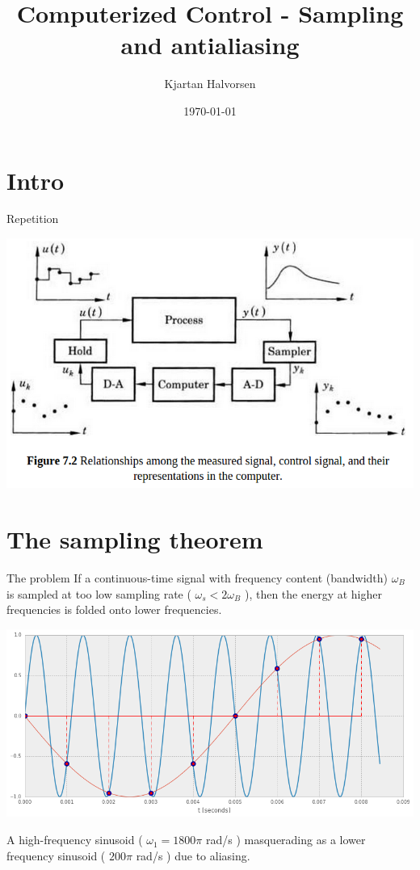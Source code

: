 \documentclass[presentation,aspectratio=169]{beamer}
\author{Kjartan Halvorsen}
\date{\today}
\title{Computerized Control - Sampling and antialiasing}
\begin{document}
\maketitle


\section{Intro}
\label{sec-1}

\begin{frame}[label=sec-1-1]{Repetition}
\begin{center}
\includegraphics[width=0.7\linewidth]{../../figures/fig7-2.png}
\end{center}
\end{frame}



\section{The sampling theorem}
\label{sec-2}
\begin{frame}[label=sec-2-1]{The problem}
If a continuous-time signal with frequency content (bandwidth) $\omega_B$ is sampled at too low sampling rate ( \(\omega_s < 2\omega_B\) ), then the energy at higher frequencies is folded onto lower frequencies. 

\begin{center}
\includegraphics[width=0.7\linewidth]{../../figures/aliasing-example.png}
\end{center}
A high-frequency sinusoid ( \(\omega_1 = 1800\pi \) rad/s ) masquerading as a lower frequency sinusoid ( \( 200 \pi \) rad/s ) due to aliasing.
\end{frame}
\end{document}
